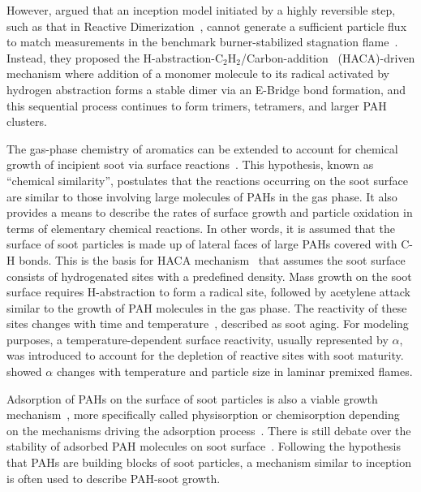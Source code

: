 However, \citet{frenklach2020mechanism} argued that an inception model initiated by a highly reversible step, such as that in Reactive Dimerization~\citep{kholghy2018reactive}, cannot generate a sufficient particle flux to match measurements in the benchmark burner-stabilized stagnation flame~\citep{abid2009quantitative}. Instead, they proposed the H-abstraction-$\mathrm{C_2H_2}$/Carbon-addition~\citep{frenklach1991detailed, appel2000kinetic} (HACA)-driven mechanism where addition of a monomer molecule to its radical activated by hydrogen abstraction forms a stable dimer via an E-Bridge bond formation, and this sequential process continues to form trimers, tetramers, and larger PAH clusters. %

The gas-phase chemistry of aromatics can be extended to account for chemical growth of incipient soot via surface reactions~\citep{frenklach2002reaction}. This hypothesis, known as “chemical similarity”, postulates that the reactions occurring on the soot surface are similar to those involving large molecules of PAHs in the gas phase. It also provides a means to describe the rates of surface growth and particle oxidation in
terms of elementary chemical reactions. In other words, it is assumed that the surface of soot particles is made up of lateral faces of large PAHs covered with C-H bonds.
This is the basis for HACA mechanism~\citep{frenklach1991detailed, appel2000kinetic} that assumes the soot surface consists of hydrogenated sites with a predefined density. Mass growth on the soot surface requires H-abstraction to form a radical
site, followed by acetylene attack similar to the growth of PAH molecules in the gas phase. The reactivity of these sites changes with time and temperature~\citep{woods1991soot, dasch1985decay}, described as soot aging. For modeling purposes, a temperature-dependent surface reactivity, usually represented by $\alpha$, was introduced to account for the depletion of reactive sites with soot maturity. \citet{appel2000kinetic} showed $\alpha$ changes with temperature and particle size in laminar premixed flames.


Adsorption of PAHs on the surface of soot particles is also a viable growth mechanism~\citep{frenklach1991detailed}, more specifically called physisorption or chemisorption depending on the mechanisms driving the adsorption process~\citep{michelsen2020review}. There is still debate over the stability of adsorbed PAH molecules on soot surface~\citep{obolensky2007interplay}. Following the hypothesis that PAHs are building blocks of soot particles, a mechanism similar to inception is often used to describe PAH-soot growth.


